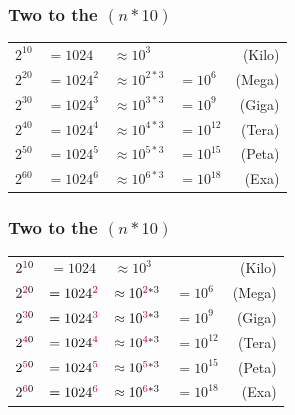 \documentclass[aspectratio=43]{beamer}
\begin{document}
\begin{frame}[fragile]

  \frametitle{Two to the $(n * 10)$}
  \renewcommand{\arraystretch}{1.5}
  \begin{tabular}{ l l l l r }
    $2^{10} $ & $ = 1024   $   & $ \approx 10^{3} $  &              & { (Kilo)} \\
    $2^{20} $ & $ = 1024^{2} $ & $ \approx 10^{2*3}$ & $ = 10^{6}$  & { (Mega)} \\
    $2^{30} $ & $ = 1024^{3} $ & $ \approx 10^{3*3}$ & $ = 10^{9}$  & { (Giga)} \\
    $2^{40} $ & $ = 1024^{4} $ & $ \approx 10^{4*3}$ & $ = 10^{12}$ & { (Tera)} \\
    $2^{50} $ & $ = 1024^{5} $ & $ \approx 10^{5*3}$ & $ = 10^{15}$ & { (Peta)} \\
    $2^{60} $ & $ = 1024^{6} $ & $ \approx 10^{6*3}$ & $ = 10^{18}$ & { (Exa)}  \\
  \end{tabular}

\end{frame}

\begin{frame}[fragile]

  \frametitle{Two to the $(n * 10)$}
  \renewcommand{\arraystretch}{1.5}
  \begin{tabular}{ l l l l r }
    $2^{\textcolor{purple}{1}0} $ & $ = 1024   $                       & $ \approx 10^{3}  $                     &              & { (Kilo)} \\
    $2^{\textcolor{purple}{2}0} $ & $ = 1024^{\textcolor{purple}{2}} $ & $ \approx 10^{\textcolor{purple}{2}*3}$ & $ = 10^{6}$  & { (Mega)} \\
    $2^{\textcolor{purple}{3}0} $ & $ = 1024^{\textcolor{purple}{3}} $ & $ \approx 10^{\textcolor{purple}{3}*3}$ & $ = 10^{9}$  & { (Giga)} \\
    $2^{\textcolor{purple}{4}0} $ & $ = 1024^{\textcolor{purple}{4}} $ & $ \approx 10^{\textcolor{purple}{4}*3}$ & $ = 10^{12}$ & { (Tera)} \\
    $2^{\textcolor{purple}{5}0} $ & $ = 1024^{\textcolor{purple}{5}} $ & $ \approx 10^{\textcolor{purple}{5}*3}$ & $ = 10^{15}$ & { (Peta)} \\
    $2^{\textcolor{purple}{6}0} $ & $ = 1024^{\textcolor{purple}{6}} $ & $ \approx 10^{\textcolor{purple}{6}*3}$ & $ = 10^{18}$ & { (Exa)}  \\
  \end{tabular}

\end{frame}
\end{document}
